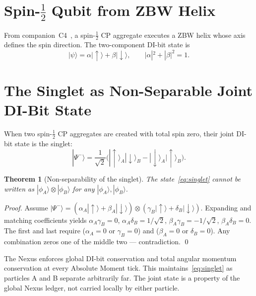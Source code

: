 \documentclass[11pt,a4paper]{article}
\newtheorem{theorem}{Theorem}[section]
\newcommand{\ket}[1]{|#1\rangle}
\begin{document}
\section{Spin-$\tfrac12$ Qubit from ZBW Helix}

From companion~C4~\cite{abshier2026c4}, a spin-$\tfrac12$ CP
aggregate executes a ZBW helix whose axis defines the spin direction.
The two-component DI-bit state is
\begin{equation}
\ket{\psi} = \alpha\ket{\uparrow} + \beta\ket{\downarrow},
\qquad |\alpha|^2 + |\beta|^2 = 1.
\label{eq:qubit}
\end{equation}

\section{The Singlet as Non-Separable Joint DI-Bit State}

When two spin-$\tfrac12$ CP aggregates are created with total spin
zero, their joint DI-bit state is the singlet:
\begin{equation}
\ket{\Psi^-} = \frac{1}{\sqrt{2}}
\bigl(\ket{\uparrow}_A\ket{\downarrow}_B
    - \ket{\downarrow}_A\ket{\uparrow}_B\bigr).
\label{eq:singlet}
\end{equation}

\begin{theorem}[Non-separability of the singlet]
\label{thm:nonsep}
The state~\eqref{eq:singlet} cannot be written as
$\ket{\phi_A}\otimes\ket{\phi_B}$ for any
$\ket{\phi_A},\ket{\phi_B}$.
\end{theorem}

\begin{proof}
Assume $\ket{\Psi^-} = (\alpha_A\ket{\uparrow}+\beta_A\ket{\downarrow})
\otimes (\gamma_B\ket{\uparrow}+\delta_B\ket{\downarrow})$.  Expanding
and matching coefficients yields $\alpha_A\gamma_B = 0$,
$\alpha_A\delta_B = 1/\sqrt{2}$, $\beta_A\gamma_B = -1/\sqrt{2}$,
$\beta_A\delta_B = 0$.  The first and last require ($\alpha_A=0$ or
$\gamma_B=0$) and ($\beta_A=0$ or $\delta_B=0$).  Any combination
zeros one of the middle two --- contradiction. \qed
\end{proof}

The Nexus enforces global DI-bit conservation and total angular
momentum conservation at every Absolute Moment tick.  This
maintains~\eqref{eq:singlet} as particles A and B separate
arbitrarily far.  The joint state is a property of the global
Nexus ledger, not carried locally by either particle.
\end{document}
